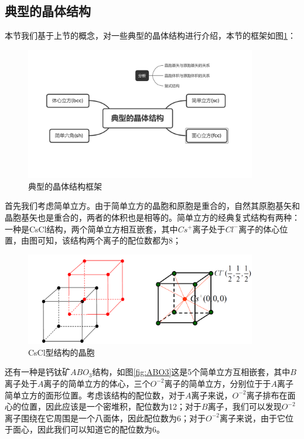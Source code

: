 \documentclass{ctexart}
\begin{document}
    \subsection{典型的晶体结构}
    本节我们基于上节的概念，对一些典型的晶体结构进行介绍，本节的框架如图\ref{fig:classiccrystalstructure}：
    \begin{figure}[H]
        \centering
        \includegraphics[width=0.9\textwidth]{figure/classiccrystalstructure.png}
        \caption{典型的晶体结构框架}
        \label{fig:classiccrystalstructure}
    \end{figure}
    
    首先我们考虑简单立方。由于简单立方的晶胞和原胞是重合的，自然其原胞基矢和晶胞基矢也是重合的，两者的体积也是相等的。简单立方的经典复式结构有两种：一种是CsCl结构，两个简单立方相互嵌套，其中$Cs^+$离子处于$Cl^-$离子的体心位置，由图可知，该结构两个离子的配位数都为8；
    \begin{figure}[H]
        \centering
        \includegraphics[width=0.9\textwidth]{figure/sc_CsCl.png}
        \caption{CsCl型结构的晶胞}
        \label{fig:CsCl}
    \end{figure}
    
    
    还有一种是钙钛矿$ABO_3$结构，如图\ref{fig:ABO3}这是5个简单立方互相嵌套，其中$B$离子处于$A$离子的简单立方的体心，三个$O^{-2}$离子的简单立方，分别位于于$A$离子简单立方的面形位置。考虑该结构的配位数，对于$A$离子来说，$O^{-2}$离子排布在面心的位置，因此应该是一个密堆积，配位数为12；对于$B$离子，我们可以发现$O^{-2}$离子围绕在它周围是一个八面体，因此配位数为6；对于$O^{-2}$离子来说，由于它位于面心，因此我们可以知道它的配位数为6。
    
\end{document}
